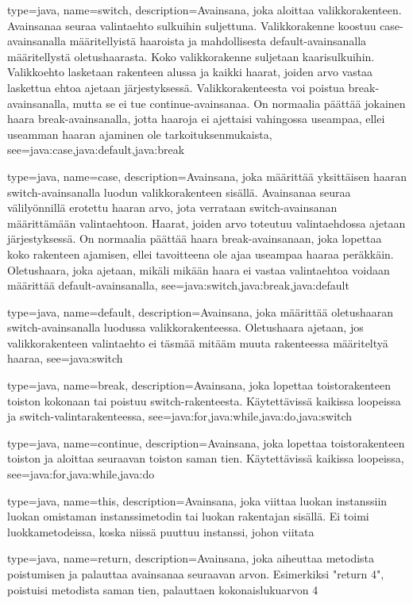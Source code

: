 {
	type=java,
	name=switch,
	description={Avainsana, joka aloittaa valikkorakenteen. Avainsanaa seuraa valintaehto
sulkuihin suljettuna. Valikkorakenne koostuu case-avainsanalla määritellyistä haaroista ja
mahdollisesta default-avainsanalla määritellystä oletushaarasta. Koko valikkorakenne suljetaan
kaarisulkuihin. Valikkoehto lasketaan rakenteen alussa ja kaikki haarat, joiden arvo vastaa
laskettua ehtoa ajetaan järjestyksessä. Valikkorakenteesta voi poistua break-avainsanalla, mutta
se ei tue continue-avainsanaa. On normaalia päättää jokainen haara break-avainsanalla, jotta
haaroja ei ajettaisi vahingossa useampaa, ellei useamman haaran ajaminen ole
tarkoituksenmukaista},
	see={java:case,java:default,java:break}
}

{
	type=java,
	name=case,
	description={Avainsana, joka määrittää yksittäisen haaran switch-avainsanalla luodun
valikkorakenteen sisällä. Avainsanaa seuraa välilyönnillä erotettu haaran arvo, jota verrataan
switch-avainsanan määrittämään valintaehtoon. Haarat, joiden arvo toteutuu valintaehdossa ajetaan
järjestyksessä. On normaalia päättää haara break-avainsanaan, joka lopettaa koko rakenteen
ajamisen, ellei tavoitteena ole ajaa useampaa haaraa peräkkäin. Oletushaara, joka ajetaan, mikäli
mikään haara ei vastaa valintaehtoa voidaan määrittää default-avainsanalla},
	see={java:switch,java:break,java:default}
}

{
	type=java,
	name=default,
	description={Avainsana, joka määrittää oletushaaran switch-avainsanalla luodussa
valikkorakenteessa. Oletushaara ajetaan, jos valikkorakenteen valintaehto ei täsmää mitääm muuta
rakenteessa määriteltyä haaraa},
	see=java:switch
}

{
	type=java,
	name=break,
	description={Avainsana, joka lopettaa toistorakenteen toiston kokonaan tai poistuu
switch-rakenteesta. Käytettävissä kaikissa loopeissa ja switch-valintarakenteessa},
	see={java:for,java:while,java:do,java:switch}
}

{
	type=java,
	name=continue,
	description={Avainsana, joka lopettaa toistorakenteen toiston ja aloittaa seuraavan toiston
saman tien. Käytettävissä kaikissa loopeissa},
	see={java:for,java:while,java:do}
}

{
	type=java,
	name=this,
	description={Avainsana, joka viittaa luokan instanssiin luokan omistaman instanssimetodin tai
luokan rakentajan sisällä. Ei toimi luokkametodeissa, koska niissä puuttuu instanssi, johon
viitata}
}

{
	type=java,
	name=return,
	description={Avainsana, joka aiheuttaa metodista poistumisen ja palauttaa avainsanaa seuraavan
arvon. Esimerkiksi "return 4", poistuisi metodista saman tien, palauttaen kokonaislukuarvon 4}
}